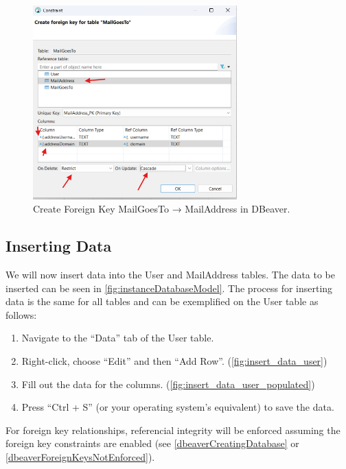 \documentclass[a4paper,11pt,oneside]{article}
\begin{document}
\begin{sloppypar}
\begin{figure}[!htb]
  \centering
  \includegraphics[width=0.7\textwidth]{dbeaver/create_foreign_key_mail_goes_to_mail_address.png}
  \caption{Create Foreign Key MailGoesTo → MailAddress in DBeaver.}
  \label{fig:create_foreign_key_mail_goes_to_mail_address}
\end{figure}


\subsection{Inserting Data}
\label{dbeaverInsertingData}

We will now insert data into the User and MailAddress tables. The data to be inserted can be seen in \autoref{fig:instanceDatabaseModel}. The process for inserting data is the same for all tables and can be exemplified on the User table as follows:

\begin{enumerate}
  \item Navigate to the ``Data'' tab of the User table.
  \item Right-click, choose ``Edit'' and then ``Add Row''. (\autoref{fig:insert_data_user})
  \item Fill out the data for the columns. (\autoref{fig:insert_data_user_populated})
  \item Press ``Ctrl + S'' (or your operating system's equivalent) to save the data.
\end{enumerate}

For foreign key relationships, referencial integrity will be enforced assuming the foreign key constraints are enabled (see \autoref{dbeaverCreatingDatabase} or \autoref{dbeaverForeignKeysNotEnforced}).


\end{sloppypar}
\end{document}
